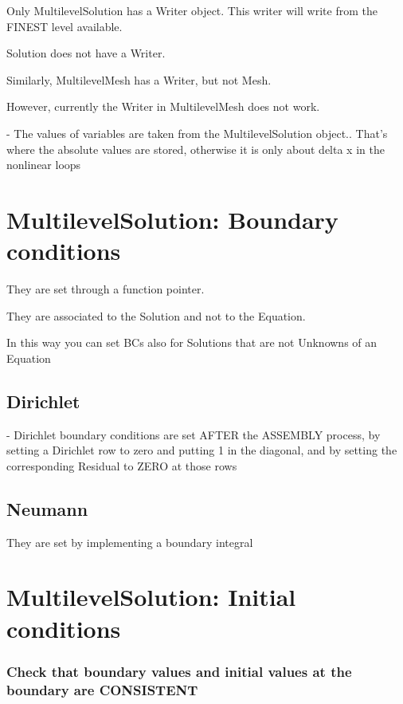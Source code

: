 \documentclass[10pt]{book}
\begin{document}
   Only MultilevelSolution has a Writer object. This writer will write from the FINEST level available.
   
   Solution does not have a Writer.
   
   Similarly, MultilevelMesh has a Writer, but not Mesh.
  
   However, currently the Writer in MultilevelMesh does not work.
   

   - The values of variables are taken from the MultilevelSolution object..
     That's where the absolute values are stored, otherwise it is only about delta x in the nonlinear loops

     
  \section{MultilevelSolution: Boundary conditions}

  
  They are set through a function pointer.
  
  They are associated to the Solution and not to the Equation.
  
  In this way you can set BCs also for Solutions that are not Unknowns of an Equation

   \subsection{Dirichlet}
  
  -  Dirichlet boundary conditions are set AFTER the ASSEMBLY process,
     by setting a Dirichlet row to zero and putting 1 in the diagonal,
     and by setting the corresponding Residual to ZERO at those rows
  
   \subsection{Neumann}
   
    They are set by implementing a boundary integral
    
    
    
  
  
  \section{MultilevelSolution: Initial conditions}
  
  \subsubsection{Check that boundary values and initial values at the boundary are CONSISTENT}
\end{document}
